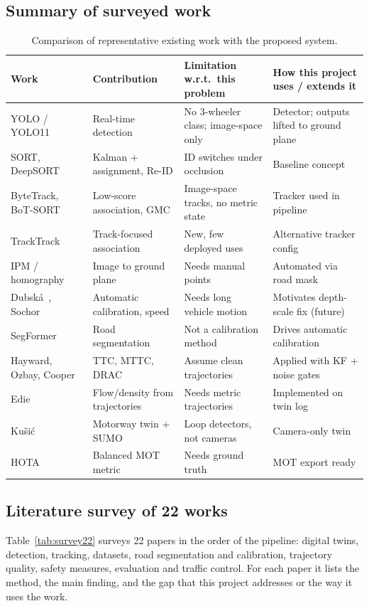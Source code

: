 \documentclass[11pt,a4paper]{article}
\begin{document}
\subsection{Summary of surveyed work}
\begin{table}[H]
\centering\small
\caption{Comparison of representative existing work with the proposed system.}
\label{tab:lit}
\begin{tabularx}{\textwidth}{@{}l Y Y Y@{}}
\toprule
\textbf{Work} & \textbf{Contribution} & \textbf{Limitation w.r.t.\ this problem} & \textbf{How this project uses / extends it}\\
\midrule
YOLO / YOLO11~\cite{redmon2016,yolo11} & Real-time detection & No 3-wheeler class; image-space only & Detector; outputs lifted to ground plane\\
SORT, DeepSORT~\cite{bewley2016,wojke2017} & Kalman + assignment, Re-ID & ID switches under occlusion & Baseline concept\\
ByteTrack, BoT-SORT~\cite{zhang2022,aharon2022} & Low-score association, GMC & Image-space tracks, no metric state & Tracker used in pipeline\\
TrackTrack~\cite{shim2025} & Track-focused association & New, few deployed uses & Alternative tracker config\\
IPM / homography~\cite{mallot1991,hartley2004} & Image to ground plane & Needs manual points & Automated via road mask\\
Dubsk\'{a}~\cite{dubska2014}, Sochor~\cite{sochor2019} & Automatic calibration, speed & Needs long vehicle motion & Motivates depth-scale fix (future)\\
SegFormer~\cite{xie2021} & Road segmentation & Not a calibration method & Drives automatic calibration\\
Hayward, Ozbay, Cooper~\cite{hayward1972,ozbay2008,cooper1976} & TTC, MTTC, DRAC & Assume clean trajectories & Applied with KF + noise gates\\
Edie~\cite{edie1963} & Flow/density from trajectories & Needs metric trajectories & Implemented on twin log\\
Ku\v{s}i\'{c}~\cite{kusic2023} & Motorway twin + SUMO & Loop detectors, not cameras & Camera-only twin\\
HOTA~\cite{luiten2021} & Balanced MOT metric & Needs ground truth & MOT export ready\\
\bottomrule
\end{tabularx}
\end{table}

\subsection{Literature survey of 22 works}
Table~\ref{tab:survey22} surveys 22 papers in the order of the pipeline: digital twins, detection, tracking,
datasets, road segmentation and calibration, trajectory quality, safety measures, evaluation and traffic control.
For each paper it lists the method, the main finding, and the gap that this project addresses or the way it uses the work.
\end{document}
